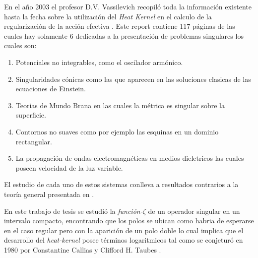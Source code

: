 \documentclass[11pt]{book}
\begin{document}
	En el año 2003 el profesor D.V. Vassilevich recopiló toda la información existente hasta la fecha sobre la utilización del {\it Heat Kernel} en el calculo de la regularización de la acción efectiva  \cite{Vassilevich:2003xt}. 	
	Este report contiene 117 páginas de las cuales hay solamente 6 dedicadas a la presentación de problemas singulares los cuales son:
\begin{enumerate}
\item Potenciales no integrables, como el oscilador armónico.
\item Singularidades cónicas como las que aparecen en las soluciones clasicas de las ecuaciones de Einstein.
\item Teorias de Mundo Brana en las cuales la métrica es singular sobre la superficie.
\item Contornos no suaves como por ejemplo las esquinas en un dominio rectangular.
\item La propagación de ondas electromagnéticas en medios dieletricos las cuales poseen velocidad de la luz variable.
\end{enumerate}	
El estudio de cada uno de estos sistemas conlleva a resultados contrarios a la teoría general presentada en \cite{Vassilevich:2003xt}.

En este trabajo de tesis se estudió la {\it función-$\zeta$} de un operador singular en un intervalo compacto, encontrando que los polos se ubican como habria de esperarse en el caso regular pero con la aparición de un polo doble lo cual implica que el desarrollo del {\it heat-kernel} posee términos logaritmicos tal como se conjeturó en 1980 por Constantine Callias y Clifford H. Taubes \cite{callias1980}.

\end{document}
